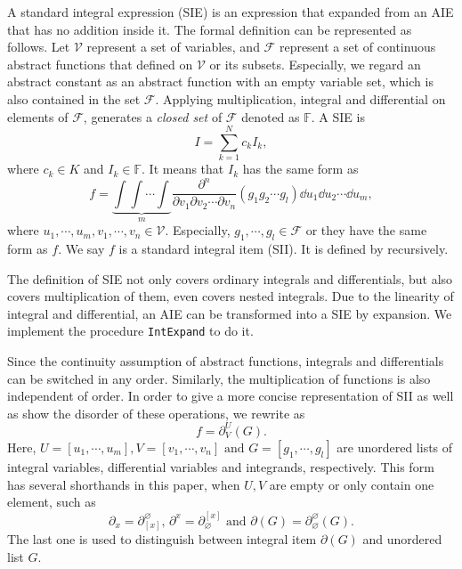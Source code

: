 A standard integral expression (SIE) is an expression that expanded from an AIE that has no addition inside it. The formal definition can be represented as follows. Let $\mathcal V$ represent a set of variables, and $\mathcal F$ represent a set of continuous abstract functions that defined on $\mathcal V$ or its subsets. Especially, we regard an abstract constant as an abstract function with an empty variable set, which is also contained in the set $\mathcal F$. Applying  multiplication, integral and differential on elements of $\mathcal F$, generates a \emph{closed set} of $\mathcal F$ denoted as $\mathbb F$. A SIE is
\begin{equation}
I = \sum_{k=1}^N{c_k I_k},
\label{std_form}
\end{equation} 
where $c_k \in K$ and $I_k \in \mathbb F$. It means that $I_k$ has the same form as 
\begin{equation} 
f =\underbrace{\int\!\int\!\cdots\!\int}_m{ \frac{\partial^n}{\partial v_1 \partial v_2 \cdots \partial v_n} (g_1 g_2 \cdots g_l)\dd u_1 \dd u_2 \cdots \dd u_m},
\label{int_form}
\end{equation} 
where $u_1,\cdots,u_m,v_1,\cdots,v_n \in \mathcal V$. Especially, $g_1,\cdots,g_l \in \mathcal F$ or they have the same form as $f$. We say $f$ is a standard integral item (SII). It is defined by   recursively.

The definition of SIE not only covers ordinary integrals and differentials, but also covers multiplication of them, even covers nested integrals. Due to the linearity of integral and differential, an AIE can be transformed into a SIE by expansion. We implement the procedure \verb|IntExpand| to do it. 

Since the continuity assumption of abstract functions, integrals and differentials can be switched in any order. Similarly, the multiplication of functions is also independent of order. In order to give a more concise representation of SII as well as show the disorder of these operations, we rewrite  as
\begin{equation} 
f=\partial^U_V(G). \label{st_form}
\end{equation} 
Here,  $U=[u_1,\cdots,u_m], V=[v_1,\cdots,v_n] \text{~and~} G=[g_1,\cdots,g_l]$ are unordered lists of integral variables, differential variables and integrands, respectively. This form has several shorthands in this paper, when $U,V$ are empty or only contain one element, such as 
\begin{equation}
    \partial_x=\partial^\varnothing_{[x]} \text{,~} \partial^x=\partial_\varnothing^{[x]} \text{~and~} \partial(G)=\partial^\varnothing_\varnothing(G).
\end{equation}
The last one is used to distinguish between integral item $\partial(G)$ and unordered list $G$. 

